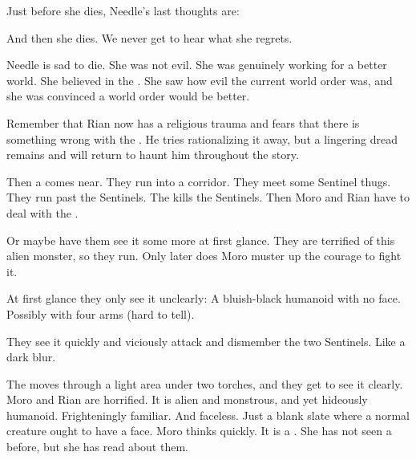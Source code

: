 Just before she dies, Needle's last thoughts are: 

And then she dies. 
We never get to hear what she regrets. 

Needle is sad to die. 
She was not evil.
She was genuinely working for a better world. 
She believed in the \resphain.
She saw how evil the current world order was, and she was convinced a \resphan world order would be better. 

Remember that Rian now has a religious trauma and fears that there is something wrong with the \sephiroth. 
He tries rationalizing it away, but a lingering dread remains and will return to haunt him throughout the story. 







\begin{comment}
  \section{Moro and Rian attacked by Bane}
\end{comment}
\new 
Then a \bane comes near. 
They run into a corridor. 
They meet some Sentinel thugs.
They run past the Sentinels.
The \bane kills the Sentinels.
Then Moro and Rian have to deal with the \bane. 

Or maybe have them see it some more at first glance.
They are terrified of this alien monster, so they run.
Only later does Moro muster up the courage to fight it. 

At first glance they only see it unclearly:
A bluish-black humanoid with no face.
Possibly with four arms (hard to tell). 

They see it quickly and viciously attack and dismember the two Sentinels.
Like a dark blur. 

The \bane moves through a light area under two torches, and they get to see it clearly. 
Moro and Rian are horrified. 
It is alien and monstrous, and yet hideously humanoid. 
Frighteningly familiar.
And faceless. 
Just a blank slate where a normal creature ought to have a face. 
Moro thinks quickly. 
It is a \bane. 
She has not seen a \bane before, but she has read about them.


